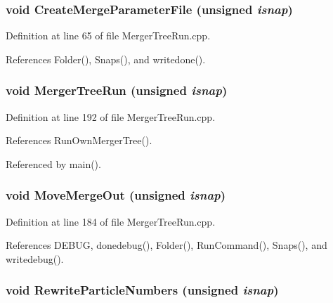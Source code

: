 \subsubsection[{CreateMergeParameterFile}]{\setlength{\rightskip}{0pt plus 5cm}void CreateMergeParameterFile (unsigned {\em isnap})}\label{MergerTreeRun_8cpp_a1f0b0ef934eb143911f6c3b24a51dd8c}


Definition at line 65 of file MergerTreeRun.cpp.



References Folder(), Snaps(), and writedone().

\subsubsection[{MergerTreeRun}]{\setlength{\rightskip}{0pt plus 5cm}void MergerTreeRun (unsigned {\em isnap})}\label{MergerTreeRun_8cpp_a7fd5b46e681f15aaa5ca850f51d1fee4}


Definition at line 192 of file MergerTreeRun.cpp.



References RunOwnMergerTree().



Referenced by main().

\subsubsection[{MoveMergeOut}]{\setlength{\rightskip}{0pt plus 5cm}void MoveMergeOut (unsigned {\em isnap})}\label{MergerTreeRun_8cpp_ac3ed79fc9e96ec7f92c032854e2f0e05}


Definition at line 184 of file MergerTreeRun.cpp.



References DEBUG, donedebug(), Folder(), RunCommand(), Snaps(), and writedebug().

\subsubsection[{RewriteParticleNumbers}]{\setlength{\rightskip}{0pt plus 5cm}void RewriteParticleNumbers (unsigned {\em isnap})}\label{MergerTreeRun_8cpp_a23cf6a553f869f6aaa2805d8a6c6dd1b}


